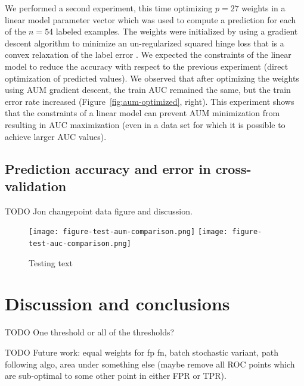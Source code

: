\documentclass{article}
\begin{document}
We performed a second experiment, this time optimizing  $p=27$ weights in a linear model parameter vector which was used to compute a prediction for each of the $n=54$ labeled examples.
The weights were initialized by using a gradient descent algorithm to minimize an un-regularized squared hinge loss that is a convex relaxation of the label error \citep{Hocking2013icml}.
We expected the constraints of the linear model to reduce the accuracy with respect to the previous experiment (direct optimization of predicted values).
We observed that after optimizing the weights using AUM gradient descent, the train AUC remained the same, but the train error rate increased (Figure~\ref{fig:aum-optimized}, right).
This experiment shows that the constraints of a linear model can prevent AUM minimization from resulting in AUC maximization (even in a data set for which it is possible to achieve larger AUC values).

\subsection{Prediction accuracy and error in cross-validation}

TODO Jon changepoint data figure and discussion.




\begin{figure}[ht]
\vskip 0.2in
\begin{center}
\texttt{[image: figure-test-aum-comparison.png]}
\texttt{[image: figure-test-auc-comparison.png]}
\vskip -0.5cm
\caption{Testing text}
\label{fig:test-aum-comparison}
\end{center}
\vskip -0.2in
\end{figure}
\section{Discussion and conclusions}
\label{sec:discussion}

TODO One threshold or all of the thresholds?

TODO Future work: equal weights for fp fn, batch stochastic variant, path following algo, area under something else (maybe remove all ROC points which are sub-optimal to some other point in either FPR or TPR).

\end{document}

